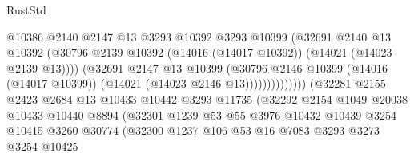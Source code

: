 \begin{lexlean}{RustStd}
\begin{coremodule}
                                          @10386
                                          @2140
                                          @2147
                                          @13
                                          @3293
                                          @10392
                                          @3293
                                          @10399
                                          (@32691
                                            @2140
                                            @13
                                            @10392
                                            (@30796
                                              @2139
                                              @10392
                                              (@14016 (@14017 @10392))
                                              (@14021 (@14023 @2139 @13))))
                                          (@32691
                                            @2147
                                            @13
                                            @10399
                                            (@30796
                                              @2146
                                              @10399
                                              (@14016 (@14017 @10399))
                                              (@14021 (@14023 @2146 @13))))))))))))))
                      (@32281
                        @2155
                        @2423
                        @2684
                        @13
                        @10433
                        @10442
                        @3293
                        @11735
                        (@32292
                          @2154
                          @1049
                          @20038
                          @10433
                          @10440
                          @8894
                          (@32301
                            @1239
                            @53
                            @55
                            @3976
                            @10432
                            @10439
                            @3254
                            @10415
                            @3260
                            @30774
                            (@32300
                              @1237
                              @106
                              @53
                              @16
                              @7083
                              @3293
                              @3273
                              @3254
                              @10425

\end{coremodule}
\end{lexlean}
